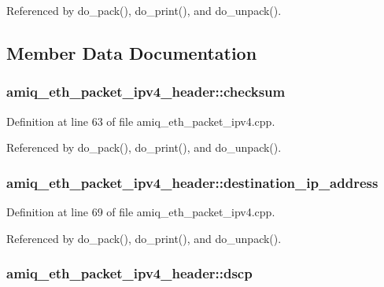 Referenced by do\_\-pack(), do\_\-print(), and do\_\-unpack().

\subsection{Member Data Documentation}
\hypertarget{classamiq__eth__packet__ipv4__header_a115c8df31edf4ce462e76eccaa26cfeb}{
\subsubsection[{checksum}]{ {\bf amiq\_\-eth\_\-packet\_\-ipv4\_\-header::checksum}}}
\label{classamiq__eth__packet__ipv4__header_a115c8df31edf4ce462e76eccaa26cfeb}


Definition at line 63 of file amiq\_\-eth\_\-packet\_\-ipv4.cpp.

Referenced by do\_\-pack(), do\_\-print(), and do\_\-unpack().\hypertarget{classamiq__eth__packet__ipv4__header_a28faea90dac453c655706af92d137ab1}{
\subsubsection[{destination\_\-ip\_\-address}]{ {\bf amiq\_\-eth\_\-packet\_\-ipv4\_\-header::destination\_\-ip\_\-address}}}
\label{classamiq__eth__packet__ipv4__header_a28faea90dac453c655706af92d137ab1}


Definition at line 69 of file amiq\_\-eth\_\-packet\_\-ipv4.cpp.

Referenced by do\_\-pack(), do\_\-print(), and do\_\-unpack().\hypertarget{classamiq__eth__packet__ipv4__header_a8e82ba2350cd440d4a1e2e93a2979de6}{
\subsubsection[{dscp}]{ {\bf amiq\_\-eth\_\-packet\_\-ipv4\_\-header::dscp}}}
\label{classamiq__eth__packet__ipv4__header_a8e82ba2350cd440d4a1e2e93a2979de6}



